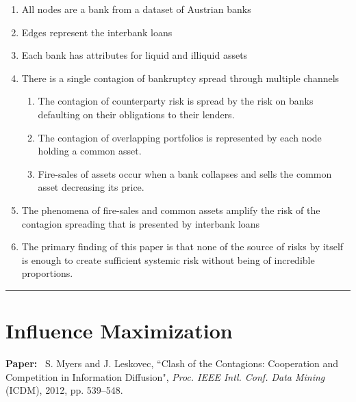 \documentclass[11pt]{article}
\begin{document}
\begin{enumerate}
    \item All nodes are a bank from a dataset of Austrian banks
    \item Edges represent the interbank loans
    \item Each bank has attributes for liquid and illiquid assets
    \item There is a single contagion of bankruptcy spread through multiple channels
    \begin{enumerate}
    \item The contagion of counterparty risk is spread by the risk on banks defaulting on their obligations to their lenders.
    \item The contagion of overlapping portfolios is represented by each node holding a common asset.
    \item Fire-sales of assets occur when a bank collapses and sells the common asset decreasing its price.
    \end{enumerate}
    \item The phenomena of fire-sales and common assets amplify the risk of the contagion spreading that is presented by interbank loans
    \item The primary finding of this paper is that none of the source of risks by itself is enough to create sufficient systemic risk without being of incredible proportions.
\end{enumerate}
\smallskip

\noindent
\rule{\textwidth}{0.01in}

\clearpage

\section{Influence Maximization}

\noindent
\textbf{Paper:}~ 
S. Myers and J. Leskovec, ``Clash of the Contagions: Cooperation and
Competition in Information Diffusion", \emph{Proc. IEEE Intl. Conf. Data Mining}
(ICDM), 2012, pp. 539--548.
\end{document}
